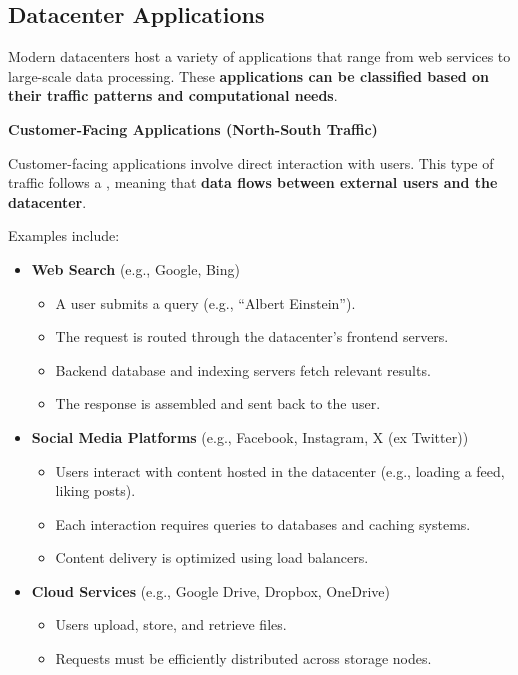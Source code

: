 \subsection{Datacenter Applications}

Modern datacenters host a variety of applications that range from web services to large-scale data processing. These \textbf{applications can be classified based on their traffic patterns and computational needs}.  

\highspace
\begin{flushleft}
    \textcolor{Green3}{ \textbf{Customer-Facing Applications (North-South Traffic)}}
\end{flushleft}
Customer-facing applications involve direct interaction with users. This type of traffic follows a , meaning that \textbf{data flows between external users and the datacenter}.

\begin{examplebox}
    Examples include:
    \begin{itemize}
        \item \textcolor{Green3}{\textbf{Web Search}} (e.g., Google, Bing)
        \begin{itemize}
            \item A user submits a query (e.g., ``Albert Einstein'').
            \item The request is routed through the datacenter's frontend servers.
            \item Backend database and indexing servers fetch relevant results.
            \item The response is assembled and sent back to the user.
        \end{itemize}
    
        \item \textcolor{Green3}{\textbf{Social Media Platforms}} (e.g., Facebook, Instagram, X (ex Twitter))
        \begin{itemize}
            \item Users interact with content hosted in the datacenter (e.g., loading a feed, liking posts).
            \item Each interaction requires queries to databases and caching systems.
            \item Content delivery is optimized using load balancers.
        \end{itemize}
    
        \item \textcolor{Green3}{\textbf{Cloud Services}} (e.g., Google Drive, Dropbox, OneDrive)
        \begin{itemize}
            \item Users upload, store, and retrieve files.
            \item Requests must be efficiently distributed across storage nodes.
        \end{itemize}
    \end{itemize}
\end{examplebox}

